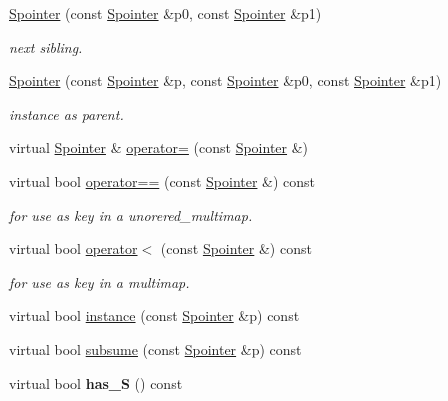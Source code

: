 \begin{DoxyCompactItemize}
\mbox{\hyperlink{group__table_gac303715911a48c482acb6ae4188508d3}{Spointer}} (const \mbox{\hyperlink{classSpointer}{Spointer}} \&p0, const \mbox{\hyperlink{classSpointer}{Spointer}} \&p1)
\begin{DoxyCompactList}\small\item\em next sibling. \end{DoxyCompactList}\item 
\mbox{\hyperlink{group__table_gad078973f8318ccf5800db79e87584dcc}{Spointer}} (const \mbox{\hyperlink{classSpointer}{Spointer}} \&p, const \mbox{\hyperlink{classSpointer}{Spointer}} \&p0, const \mbox{\hyperlink{classSpointer}{Spointer}} \&p1)
\begin{DoxyCompactList}\small\item\em instance as parent. \end{DoxyCompactList}\item 
virtual \mbox{\hyperlink{classSpointer}{Spointer}} \& \mbox{\hyperlink{group__table_ga88eb3c521aa1c9bc9b8891f20b9a01eb}{operator=}} (const \mbox{\hyperlink{classSpointer}{Spointer}} \&)
\item 
virtual bool \mbox{\hyperlink{group__table_gacb9d4d8e3da8a1e082b80fd31abb9772}{operator==}} (const \mbox{\hyperlink{classSpointer}{Spointer}} \&) const
\begin{DoxyCompactList}\small\item\em for use as key in a unorered\+\_\+multimap. \end{DoxyCompactList}\item 
virtual bool \mbox{\hyperlink{group__table_ga797b376c9ed1b4777ea94ff8350c65c8}{operator$<$}} (const \mbox{\hyperlink{classSpointer}{Spointer}} \&) const
\begin{DoxyCompactList}\small\item\em for use as key in a multimap. \end{DoxyCompactList}\item 
virtual bool \mbox{\hyperlink{group__table_ga718cc6f7473c3fb1b074211bf2f16d8b}{instance}} (const \mbox{\hyperlink{classSpointer}{Spointer}} \&p) const
\item 
virtual bool \mbox{\hyperlink{group__table_ga06fa67855bfb50d81e18bdfacce965ce}{subsume}} (const \mbox{\hyperlink{classSpointer}{Spointer}} \&p) const
\item 
\mbox{\label{classSpointer_aec852b63ae9427911ff290979bc0a4b4}} 
virtual bool {\bfseries has\+\_\+S} () const
\item 
\mbox{\label{classSpointer_a8fa50c04246ceb3a48e961946a2427f7}} 

\end{DoxyCompactItemize}
